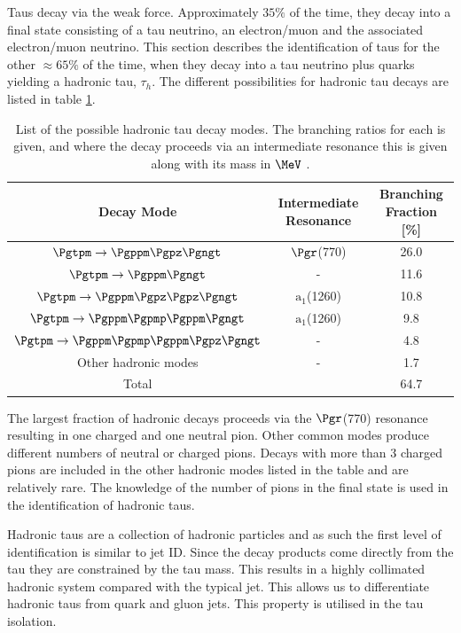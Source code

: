 Taus decay via the weak force. Approximately $35\%$ of the time, they decay into a final state consisting of a tau
neutrino, an electron/muon and the associated electron/muon neutrino. 
This section describes the identification of taus for the other $\approx65\%$ of the time,
when they decay into a tau neutrino plus quarks yielding a hadronic tau, $\tau_{h}$. The different
possibilities for hadronic tau decays are listed in table \ref{tab:hadronictaus}.

\begin{table}[bth]
\begin{tabular}{|c|c|c|}
\hline
Decay Mode & Intermediate Resonance & Branching Fraction [\%] \\
\hline
\hline
$\Pgtpm\to\Pgppm\Pgpz\Pgngt$ & $\Pgr$(770) & 26.0 \\
\hline
$\Pgtpm\to\Pgppm\Pgngt$ & -  & 11.6 \\
\hline
$\Pgtpm\to\Pgppm\Pgpz\Pgpz\Pgngt$ & $\text{a}_{1}$(1260) & 10.8 \\
\hline
$\Pgtpm\to\Pgppm\Pgpmp\Pgppm\Pgngt$ & $\text{a}_{1}$(1260) & 9.8 \\
\hline
$\Pgtpm\to\Pgppm\Pgpmp\Pgppm\Pgpz\Pgngt$ & -  & 4.8 \\
\hline
Other hadronic modes & - & 1.7 \\
\hline
\hline
Total & &  64.7 \\
\hline
\end{tabular}
\caption{List of the possible hadronic tau decay modes. The branching ratios for
each is given, and where the decay proceeds via an intermediate resonance this
is given along with its mass in $\MeV$ \cite{PDG}.}
\label{tab:hadronictaus}
\end{table}

The largest fraction of hadronic decays proceeds via the $\Pgr$(770) resonance
resulting in one charged and one neutral pion. Other common modes produce
different numbers of neutral or charged pions. Decays with more than 3 charged
pions are included in the other hadronic modes listed in the table and are
relatively rare. The knowledge of the number of pions in the final state is used in the
identification of hadronic taus.

Hadronic taus are a collection of hadronic particles and as such the first level
of identification is similar to jet ID. 
Since the decay products come directly from the tau they are constrained by the
tau mass. This results in a highly collimated hadronic system compared with the
typical jet. This allows us to differentiate hadronic taus from
quark and gluon jets. This property is utilised in the tau isolation.

